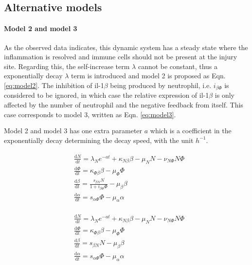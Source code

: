 \documentclass[12pt,a4paper]{report}
\begin{document}
\subsection{Alternative models}

\paragraph{Model 2 and model 3}

As the observed data indicates, this dynamic system has a steady state where the  inflammation is resolved and immune cells should not be present at the injury site. Regarding this, the self-increase term $\lambda$ cannot be constant, thus a exponentially decay $\lambda$ term is introduced and model 2 is proposed as Eqn. \ref{eq:model2}. The inhibition of il-1$\beta$ being produced by neutrophil, i.e. $i_{\beta\Phi}$ is considered to be ignored, in which case the relative expression of il-1$\beta$ is only affected by the number of neutrophil and the negative feedback from itself. This case corresponds to model 3, written as Eqn. \ref{eq:model3}.

Model 2 and model 3 has one extra parameter $a$ which is a coefficient in the exponentially decay determining the decay speed, with the unit $h^{-1}$.

\begin{align}
    \label{eq:model2}
    \begin{split}
        &\frac{\mathrm{d} N}{\mathrm{d} t}=\lambda_Ne^{-at}+\kappa_{N\beta}\beta-\mu_NN-\nu_{N\Phi}N\Phi\\
        &\frac{\mathrm{d} \Phi}{\mathrm{d} t}=\kappa_{\Phi\beta}\beta-\mu_\Phi\Phi\\
        &\frac{\mathrm{d} \beta}{\mathrm{d} t}=\frac{s_{\beta N}N}{1+i_{\beta\Phi}\Phi}-\mu_\beta\beta\\
        &\frac{\mathrm{d} \alpha}{\mathrm{d} t}=s_{\alpha\Phi}\Phi-\mu_\alpha\alpha
    \end{split}
\end{align}

\begin{align}
    \label{eq:model3}
    \begin{split}
        &\frac{\mathrm{d} N}{\mathrm{d} t}=\lambda_Ne^{-at}+\kappa_{N\beta}\beta-\mu_NN-\nu_{N\Phi}N\Phi\\
        &\frac{\mathrm{d} \Phi}{\mathrm{d} t}=\kappa_{\Phi\beta}\beta-\mu_\Phi\Phi\\
        &\frac{\mathrm{d} \beta}{\mathrm{d} t}=s_{\beta N}N-\mu_\beta\beta\\
        &\frac{\mathrm{d} \alpha}{\mathrm{d} t}=s_{\alpha\Phi}\Phi-\mu_\alpha\alpha
    \end{split}
\end{align}
\end{document}
